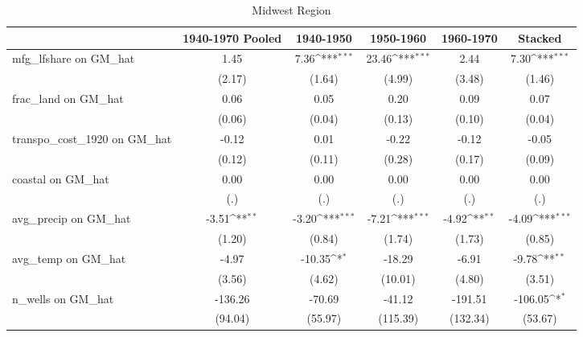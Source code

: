 \begin{table}[htbp]\centering
\def\sym#1{\ifmmode^{#1}\else\(^{#1}\)\fi}
\caption{Midwest Region}
\begin{tabular}{l*{5}{c}}
\toprule
                &\multicolumn{1}{c}{1940-1970 Pooled}&\multicolumn{1}{c}{1940-1950}&\multicolumn{1}{c}{1950-1960}&\multicolumn{1}{c}{1960-1970}&\multicolumn{1}{c}{Stacked}\\
\midrule
mfg\_lfshare on GM\_hat&     1.45         &     7.36\sym{***}&    23.46\sym{***}&     2.44         &     7.30\sym{***}\\
                &   (2.17)         &   (1.64)         &   (4.99)         &   (3.48)         &   (1.46)         \\
\addlinespace
frac\_land on GM\_hat&     0.06         &     0.05         &     0.20         &     0.09         &     0.07         \\
                &   (0.06)         &   (0.04)         &   (0.13)         &   (0.10)         &   (0.04)         \\
\addlinespace
transpo\_cost\_1920 on GM\_hat&    -0.12         &     0.01         &    -0.22         &    -0.12         &    -0.05         \\
                &   (0.12)         &   (0.11)         &   (0.28)         &   (0.17)         &   (0.09)         \\
\addlinespace
coastal on GM\_hat&     0.00         &     0.00         &     0.00         &     0.00         &     0.00         \\
                &      (.)         &      (.)         &      (.)         &      (.)         &      (.)         \\
\addlinespace
avg\_precip on GM\_hat&    -3.51\sym{**} &    -3.20\sym{***}&    -7.21\sym{***}&    -4.92\sym{**} &    -4.09\sym{***}\\
                &   (1.20)         &   (0.84)         &   (1.74)         &   (1.73)         &   (0.85)         \\
\addlinespace
avg\_temp on GM\_hat&    -4.97         &   -10.35\sym{*}  &   -18.29         &    -6.91         &    -9.78\sym{**} \\
                &   (3.56)         &   (4.62)         &  (10.01)         &   (4.80)         &   (3.51)         \\
\addlinespace
n\_wells on GM\_hat&  -136.26         &   -70.69         &   -41.12         &  -191.51         &  -106.05\sym{*}  \\
                &  (94.04)         &  (55.97)         & (115.39)         & (132.34)         &  (53.67)         \\

\end{tabular}
\end{table}

